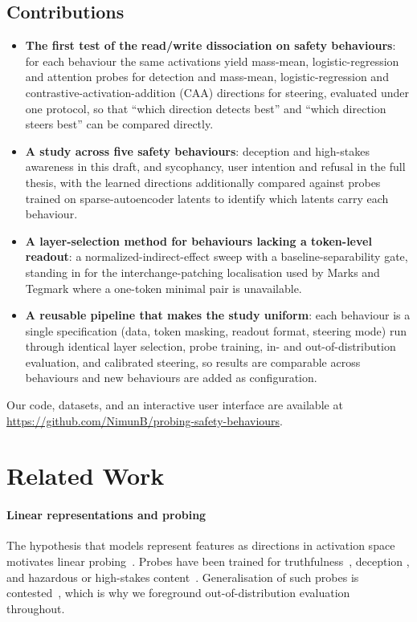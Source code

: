\documentclass[conference]{IEEEtran}
\begin{document}
\subsection*{Contributions}
\begin{itemize}
  \item \textbf{The first test of the read/write dissociation on safety
  behaviours}: for each behaviour the same activations yield mass-mean,
  logistic-regression and attention probes for detection and mass-mean,
  logistic-regression and contrastive-activation-addition (CAA) directions for
  steering, evaluated under one protocol, so that ``which direction detects
  best'' and ``which direction steers best'' can be compared directly.
  \item \textbf{A study across five safety behaviours}: deception and
  high-stakes awareness in this draft, and sycophancy, user intention and
  refusal in the full thesis, with the learned directions additionally compared
  against probes trained on sparse-autoencoder latents to identify which latents
  carry each behaviour.
  \item \textbf{A layer-selection method for behaviours lacking a token-level
  readout}: a normalized-indirect-effect sweep with a baseline-separability
  gate, standing in for the interchange-patching localisation used by
  Marks and Tegmark where a one-token minimal pair is unavailable.
  \item \textbf{A reusable pipeline that makes the study uniform}: each behaviour
  is a single specification (data, token masking, readout format, steering mode)
  run through identical layer selection, probe training, in- and
  out-of-distribution evaluation, and calibrated steering, so results are
  comparable across behaviours and new behaviours are added as configuration.
\end{itemize}

Our code, datasets, and an interactive user interface are available at \url{https://github.com/NimunB/probing-safety-behaviours}.

\section{Related Work}

\paragraph{Linear representations and probing}
The hypothesis that models represent features as directions in activation
space~\cite{elhage2022} motivates linear probing~\cite{alain2018}. Probes have
been trained for truthfulness~\cite{azaria2023,marks2024}, deception
\cite{goldowsky2025}, and hazardous or high-stakes content~\cite{mckenzie2025}.
Generalisation of such probes is contested~\cite{levinstein2024}, which is why
we foreground out-of-distribution evaluation throughout.
\end{document}
